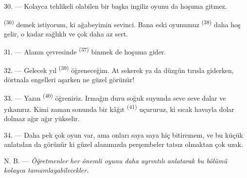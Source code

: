 30. --- Kolayca tehlikeli olabilen bir başka ingiliz oyunu da hoşuma gitmez.

 \textsuperscript{(36)} demek istiyorum, ki ağabeyimin
sevinci. Bana eski oyunumuz  \textsuperscript{(38)} daha
hoş gelir, o kadar sağlıklı ve çok daha az sert.

\VUsaut{4.6mm}
\VUsaut{3.0mm}

31. --- Alanın çevresinde  \textsuperscript{(37)} binmek de
hoşuma gider.

32. --- Gelecek yıl  \textsuperscript{(39)} öğreneceğim. At
sekerek ya da düzgün tırısla giderken, dörtnala engelleri aşarken ne güzel
görünür!

33. --- Yazın  \textsuperscript{(40)} öğreniriz. Irmağın duru
soğuk suyunda seve seve dalar ve yıkanırız. Kimi zaman sonunda bir kâğıt
 \textsuperscript{(41)} uçururuz, ki sıcak havayla dolar dolmaz
ağır ağır yükselir.

34. --- Daha pek çok oyun var, ama onları saya saya hiç bitiremem, ve bu
küçük anlatıdan da görünür ki güzel alanımızda perşembeler tatsız olmaktan çok
uzak.

N. B. --- \textit{Öğretmenler her önemli oyunu daha ayrıntılı anlatarak bu
bölümü kolayca tamamlayabilecekler.}
\VUsaut{6.0mm}
\VUfilet{22mm}
